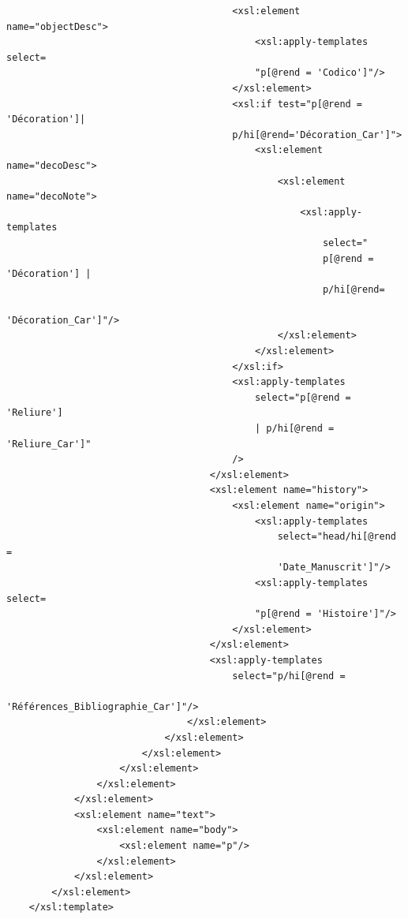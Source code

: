 \documentclass[a4paper,12pt,twoside]{book}
\begin{document}
\begin{verbatim}
                                        <xsl:element name="objectDesc">
                                            <xsl:apply-templates select=
                                            "p[@rend = 'Codico']"/>
                                        </xsl:element>
                                        <xsl:if test="p[@rend = 'Décoration']|  
                                        p/hi[@rend='Décoration_Car']">
                                            <xsl:element name="decoDesc">
                                                <xsl:element name="decoNote">
                                                    <xsl:apply-templates
                                                        select="
                                                        p[@rend = 'Décoration'] |
                                                        p/hi[@rend=
                                                        'Décoration_Car']"/>
                                                </xsl:element>
                                            </xsl:element>
                                        </xsl:if>
                                        <xsl:apply-templates
                                            select="p[@rend = 'Reliure'] 
                                            | p/hi[@rend = 'Reliure_Car']"
                                        />
                                    </xsl:element>
                                    <xsl:element name="history">
                                        <xsl:element name="origin">
                                            <xsl:apply-templates
                                                select="head/hi[@rend = 
                                                'Date_Manuscrit']"/>
                                            <xsl:apply-templates select=
                                            "p[@rend = 'Histoire']"/>
                                        </xsl:element>
                                    </xsl:element>
                                    <xsl:apply-templates
                                        select="p/hi[@rend = 
                                        'Références_Bibliographie_Car']"/>
                                </xsl:element>
                            </xsl:element>
                        </xsl:element>
                    </xsl:element>
                </xsl:element>
            </xsl:element>
            <xsl:element name="text">
                <xsl:element name="body">
                    <xsl:element name="p"/>
                </xsl:element>
            </xsl:element>
        </xsl:element>
    </xsl:template>


\end{verbatim}
\end{document}
